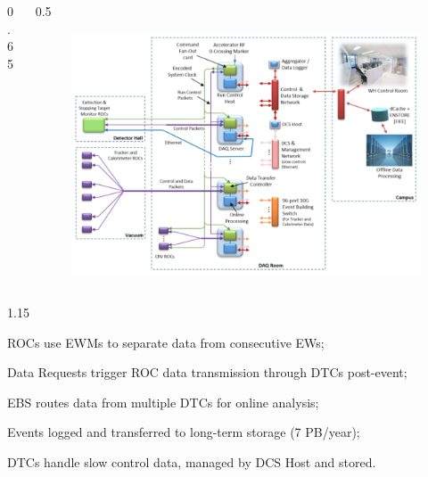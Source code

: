 \documentclass{beamer}
\begin{document}
\begin{frame}
\begin{columns}
\begin{column}{0.65\framewidth}
\begin{itemize}
{    }
    \end{itemize}
    \end{column}
    \begin{column}{0.5\framewidth}
        \begin{figure}[!h]
            \centering
            \hspace*{-2em}
            \includegraphics[width =1.1\columnwidth]{figures/png/Screenshot_20240206_144803.png}
            \label{fig:linktodaq}
            \end{figure}
    \end{column}
\end{columns}
\vspace{-1.5mm}
\begin{columns}
    \begin{column}{1.15 \framewidth}
        \setlength{\leftmargini}{1.1em}
        \begin{itemize}
          {\footnotesize 
          \item ROCs use EWMs to separate data from consecutive EWs; 
          \vspace{-0.5mm} 
          \item Data Requests trigger ROC data transmission through DTCs post-event;
        \vspace{-0.5mm} 
          \item EBS routes data from multiple DTCs for online analysis; 
        \vspace{-0.5mm} 
           \item Events logged and transferred to long-term storage (7 PB/year); 
            \vspace{-0.5mm}
            \item DTCs handle slow control data, managed by DCS Host and stored.}
        \end{itemize}
    \end{column}
\end{columns}
\end{frame}
\end{document}
